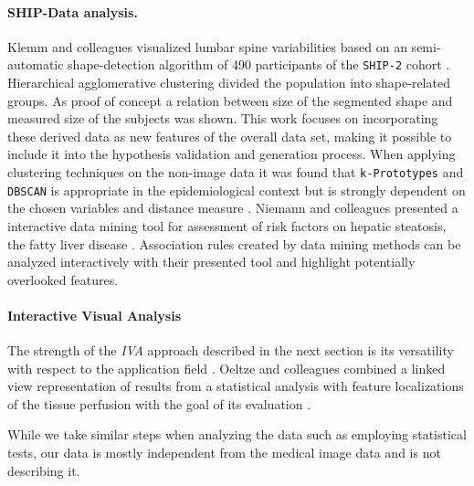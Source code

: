 \documentclass[journal]{style/vgtc} 			          %
\begin{document}
\paragraph{SHIP-Data analysis.}
Klemm and colleagues visualized lumbar spine variabilities based on an semi-automatic shape-detection algorithm of 490 participants of the \texttt{SHIP-2} cohort \cite{Klemm2013VMV}.
%
Hierarchical agglomerative clustering divided the population into shape-related groups.
%
As proof of concept a relation between size of the segmented shape and measured size of the subjects was shown.
%
This work focuses on incorporating these derived data as new features of the overall data set, making it possible to include it into the hypothesis validation and generation process.
%
When applying clustering techniques on the non-image data it was found that \texttt{k-Prototypes} and \texttt{DBSCAN} is appropriate in the epidemiological context but is strongly dependent on the chosen variables and distance measure \cite{Klemm2014BVM}.
%
Niemann and colleagues presented a interactive data mining tool for assessment of risk factors on hepatic steatosis, the fatty liver disease \cite{Niemann2014}.
%
Association rules created by data mining methods can be analyzed interactively with their presented tool and highlight potentially overlooked features.

\paragraph{Interactive Visual Analysis}
The strength of the \emph{IVA} approach described in the next section is its versatility with respect to the application field \cite{Konyha2009}.
%
Oeltze and colleagues combined a linked view representation of results from a statistical analysis with feature localizations of the tissue perfusion with the goal of its evaluation \cite{Oeltze2007}.
%

While we take similar steps when analyzing the data such as employing statistical tests, our data is mostly independent from the medical image data and is not describing it. %

\end{document}
